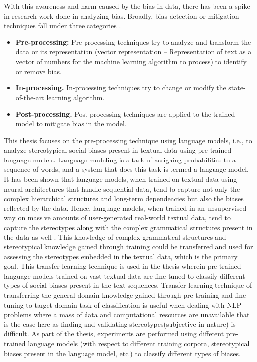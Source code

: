 With this awareness and harm caused by the bias in data, there has been a spike in research work done in analyzing bias.
Broadly, bias detection or mitigation techniques fall under three categories \cite{mehrabi2019survey}\cite{d2017conscientious}.
\begin{itemize}
    \item \textbf{Pre-processing:} Pre-processing techniques try to analyze and transform the data or its representation (vector representation – Representation of text as a vector of numbers for the machine learning algorithm to process) to identify or remove bias.
    \item \textbf{In-processing.} In-processing techniques try to change or modify the state-of-the-art learning algorithm\cite{mehrabi2019survey}\cite{d2017conscientious}.
    \item  \textbf{Post-processing.} Post-processing techniques are applied to the trained model to mitigate bias in the model.
\end{itemize}   
This thesis focuses on the pre-processing technique using language models, i.e., to analyze stereotypical social biases present in textual data using pre-trained language models. Language modeling is
a task of assigning probabilities to a sequence of words, and a system that does this task is termed a language model\cite{DNLP}. It has been shown that language
models, when trained on textual data using neural architectures that handle sequential data, tend to capture not only the complex hierarchical structures and long-term dependencies but also the biases reflected by the data. Hence,
language models, when trained in an unsupervised way on massive amounts of user-generated real-world textual data, tend to capture the stereotypes along with the complex grammatical structures present in the data as well \cite{nadeem2020stereoset}\cite{ruder2019neural}\cite{brown2020language}. This knowledge of complex grammatical structures and stereotypical knowledge gained through training could be transferred and used for assessing the stereotypes embedded in the textual data, which is the primary goal. This transfer learning technique is used in the thesis wherein pre-trained language models trained on vast textual data are fine-tuned to classify different types of social biases present in the text sequences. Transfer learning technique of transferring
the general domain knowledge gained through pre-training and fine-tuning to target domain task of classification is useful when dealing with NLP problems where a mass of data and computational resources are unavailable \cite{transfer_Learning} that is the case here as finding and validating stereotypes(subjective in nature) is difficult. As part of the thesis, experiments are performed using different pre-trained language models (with respect to different training corpora, stereotypical biases present in the language model, etc.) to classify different types of biases.
\\

